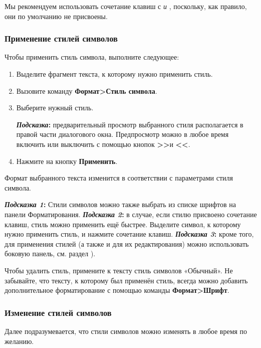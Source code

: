 ﻿\documentclass[a4paper,10pt]{article}
\begin{document}
Мы рекомендуем использовать сочетание клавиш с  \textit{и} , поскольку, как правило, они по умолчанию не присвоены.

\subsubsection{Применение стилей символов}
Чтобы применить стиль символа, выполните следующее:
\begin{enumerate}
 \item Выделите фрагмент текста, к которому нужно применить стиль.
 \item Вызовите команду \textbf{Формат>Стиль символа}.
 \item Выберите нужный стиль.
 \begin{mdframed}[backgroundcolor=blue!10]
\textbf{\textit{Подсказка}:} предварительный просмотр выбранного стиля располагается в правой части диалогового окна. Предпросмотр можно в любое время включить или выключить с помощью кнопок \textbf{>>}и \textbf{<<}.
\end{mdframed}
\item Нажмите на кнопку \textbf{Применить}.
\end{enumerate}

Формат выбранного текста изменится в соответствии с параметрами стиля символа.

\begin{mdframed}[backgroundcolor=blue!10]
\textbf{\textit{Подсказка 1}:} Стили символов можно также выбрать из списке шрифтов на панели Форматирования.
\newline
\newline
\textbf{\textit{Подсказка 2}:} в случае, если стилю присвоено сочетание клавиш, стиль можно применить ещё быстрее. Выделите символ, к которому нужно применить стиль, и нажмите сочетание клавиш.
\newline
\newline
\textbf{\textit{Подсказка 3}:} кроме того, для применения стилей (а также и для их редактирования) можно использовать боковую панель, см. раздел ).
\end{mdframed}

Чтобы удалить стиль, примените к тексту стиль символов «Обычный». Не забывайте, что тексту, к которому был применён стиль, всегда можно добавить дополнительное форматирование с помощью команды \textbf{Формат>Шрифт}.

\subsubsection{Изменение стилей символов}
Далее подразумевается, что стили символов можно изменять в любое время по желанию.
\end{document}
